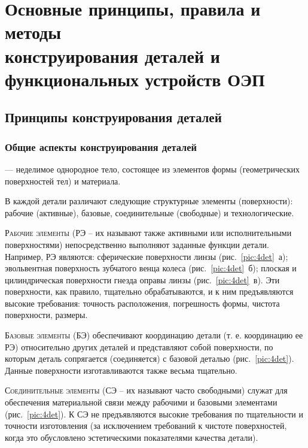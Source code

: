 \chapter[Основные принципы, правила и методы конструирования деталей и\break функциональных устройств ОЭП]{Основные принципы, правила и методы\\ конструирования деталей и\\ функциональных устройств ОЭП}


\section{Принципы конструирования деталей}

\subsection{Общие аспекты конструирования деталей}

 --- неделимое однородное тело, состоящее из элементов формы (геометрических поверхностей тел) и материала.

В каждой детали различают следующие структурные элементы (поверхности): рабочие (активные), базовые, соединительные (свободные) и технологические.

\textsc{Рабочие элементы} (РЭ -- их называют также активными или исполнительными поверхностями) непосредственно выполняют заданные функции детали. Например, РЭ являются: сферические поверхности линзы (рис.~\ref{pic:4det}~а); эвольвентная поверхность зубчатого венца колеса (рис.~\ref{pic:4det}~б); плоская и цилиндрическая поверхности гнезда оправы линзы (рис.~\ref{pic:4det}~в). Эти поверхности, как правило, тщательно обрабатываются, и к ним предъявляются высокие требования: точность расположения, погрешность формы, чистота поверхности, размеры.

\textsc{Базовые элементы} (БЭ) обеспечивают координацию детали (т. е. координацию ее РЭ) относительно других деталей и представляют собой поверхности, по которым деталь сопрягается (соединяется) с базовой деталью (рис.~\ref{pic:4det}). Данные поверхности изготавливаются также весьма тщательно.

\textsc{Соединительные элементы} (СЭ -- их называют часто свободными) служат для обеспечения материальной связи между рабочими и базовыми элементами (рис.~\ref{pic:4det}). К СЭ не предъявляются высокие требования по тщательности и точности изготовления (за исключением требований к чистоте поверхностей, когда это обусловлено эстетическими показателями качества детали).


